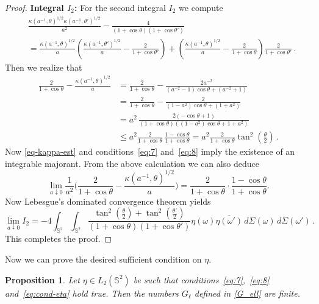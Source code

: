 \documentclass[a4paper,11pt,DIV=11,%
abstract=on%
]{scrartcl}
\newtheorem{prop}[thm]{Proposition}
\newcommand{\red}[1]{#1}
\begin{document}
\begin{proof}
	\textbf{Integral $I_2$:} For the second integral $I_2$ we compute
	\begin{align}
		&\frac{\kappa(a^{-1},\theta)^{1/2}\kappa(a^{-1},\theta')^{1/2}}{a^2}
		-\frac{4}{(1+\cos\theta)(1+\cos\theta')}\nonumber\\
		&=\frac{\kappa(a^{-1},\theta)^{1/2}}{a}
		\left(\frac{\kappa(a^{-1},\theta')^{1/2}}{a} - \frac{2}{1+\cos\theta'}\right)
		+\left(\frac{\kappa(a^{-1},\theta)^{1/2}}{a} - \frac{2}{1+\cos\theta}\right)
		\frac{2}{1+\cos\theta'}\,.\label{eq:18}
	\end{align}
	Then we realize that 
	\begin{align}
		\frac{2}{1+\cos\theta} - \frac{\kappa(a^{-1},\theta)^{1/2}}{a}
		&=  \frac{2}{1+\cos\theta} - \frac{2a^{-2}}{(a^{-2}-1)\cos\theta + (a^{-2}+1)} \nonumber\\
		&= \frac{2}{1+\cos\theta} - \frac{2}{(1-a^2)\cos\theta + (1+a^2)} \nonumber\\
		&=a^2\,\frac{2(-\cos\theta + 1)}{(1+\cos\theta)((1-a^2)\cos\theta+ 1+a^2)}\nonumber\\
		&\leq a^2\frac{2}{1+\cos\theta}\,\frac{1-\cos\theta}{1+\cos\theta}
		=a^2\frac{2}{1+\cos\theta}\tan^2(\tfrac{\theta}{2})\,.\label{eq:21}
	\end{align}
	Now \eqref{eq-kappa-est} and \red{conditions~\eqref{eq:7}
          and~\eqref{eq:8}} imply 
	the existence of an integrable majorant. 
	From the above	calculation we can also deduce
	$$\lim_{a\downarrow 0}\frac{1}{a^2}\biggl(\frac{2}{1+\cos\theta}
	-\frac{\kappa(a^{-1},\theta)^{1/2}}{a}\biggr)
	=\frac{2}{1+\cos\theta}\cdot\frac{1-\cos\theta}{1+\cos\theta}.$$
	Now Lebesgue's dominated convergence theorem yields
	$$\lim_{a\downarrow 0}I_2
	=-4\int_{\mathbb S^2}\int_{\mathbb S^2}\frac{\tan^2(\tfrac{\theta}{2})+\tan^2(\tfrac{\theta'}{2})}
	{(1+\cos\theta)(1+\cos\theta')}
	\eta(\omega)\overline{\eta(\omega')}\,d\Sigma(\omega)\,d\Sigma(\omega')\,.$$
	This completes the proof.
\end{proof}

Now we can prove the desired sufficient condition on $\eta$.

\begin{prop}\label{cor:necessary-condition}
Let $\eta\in L_2(\mathbb S^2)$ be such that \red{
conditions~\eqref{eq:7},~\eqref{eq:8} and~\eqref{eq:cond-eta} hold
true.}
	Then the numbers $G_\ell$ defined in \eqref{G_ell} 
	are finite. 
\end{prop}
\end{document}

